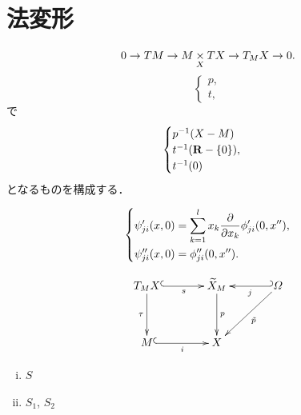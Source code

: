 \section{法変形}\label{sec41}
\begin{equation}
    0\to TM\to M\pb[X]TX\to T_{M}X\to0.
\end{equation}
\begin{equation}
    \begin{cases}
        p,\\
        t,
    \end{cases}
\end{equation}
で
\begin{equation}
    \begin{cases}
        p^{-1}(X-M)\\
        t^{-1}(\rr-\{0\}),\\
        t^{-1}(0)
    \end{cases}
\end{equation}
となるものを構成する．

\begin{equation}
    \begin{dcases}
        \psi'_{ji}(x,0)=\sum_{k=1}^{l}x_k\frac{\partial}{\partial x_k}\phi'_{ji}(0,x''),\\
        \psi''_{ji}(x,0)=\phi''_{ji}(0,x'').
    \end{dcases}
\end{equation}

\begin{equation}\label{eq415}
    \vcenter{\xymatrix@C=36pt@R=36pt{
    T_{M}X
    \ar[d]_-{\tau}
    \ar@{^{(}->}[r]_-{s}
    &
    \widetilde{X}_{M}
    \ar[d]^-{p}
    &
    \varOmega
    \ar[ld]^-{\tilde{p}}
    \ar@{_{(}->}[l]^-{j}
    \\
    M
    \ar@{^{(}->}[r]_-{i}
    &
    X
  }}
\end{equation}

\begin{DFN}
    \begin{enumerate}[(i)]
        \item \(S\)
        \item \(S_1\), \(S_2\)
    \end{enumerate}
\end{DFN}

